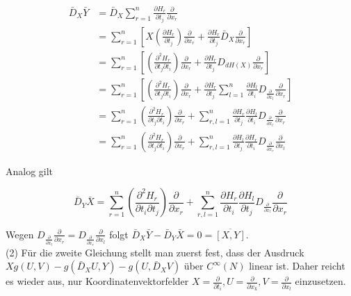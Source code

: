 \documentclass[10pt, letterpaper]{article}
\begin{document}
$$
\begin{aligned}
\bar{D}_{X} \bar{Y} & =\bar{D}_{X} \sum_{r=1}^{n} \frac{\partial H_{r}}{\partial t_{j}} \frac{\partial}{\partial x_{r}} \\
& =\sum_{r=1}^{n}\left[X\left(\frac{\partial H_{r}}{\partial t_{j}}\right) \frac{\partial}{\partial x_{r}}+\frac{\partial H_{r}}{\partial t_{j}} \bar{D}_{X} \frac{\partial}{\partial x_{r}}\right] \\
& =\sum_{r=1}^{n}\left[\left(\frac{\partial^{2} H_{r}}{\partial t_{j} \partial t_{i}}\right) \frac{\partial}{\partial x_{r}}+\frac{\partial H_{r}}{\partial t_{j}} D_{d H(X)} \frac{\partial}{\partial x_{r}}\right] \\
& =\sum_{r=1}^{n}\left[\left(\frac{\partial^{2} H_{r}}{\partial t_{j} \partial t_{i}}\right) \frac{\partial}{\partial x_{r}}+\frac{\partial H_{r}}{\partial t_{j}} \sum_{l=1}^{n} \frac{\partial H_{l}}{\partial t_{i}} D_{\frac{\partial}{\partial x_{l}}} \frac{\partial}{\partial x_{r}}\right] \\
& =\sum_{r=1}^{n}\left(\frac{\partial^{2} H_{r}}{\partial t_{j} \partial t_{i}}\right) \frac{\partial}{\partial x_{r}}+\sum_{r, l=1}^{n} \frac{\partial H_{r}}{\partial t_{j}} \frac{\partial H_{l}}{\partial t_{i}} D_{\frac{\partial}{\partial x_{l}}} \frac{\partial}{\partial x_{r}} \\
& =\sum_{r=1}^{n}\left(\frac{\partial^{2} H_{r}}{\partial t_{j} \partial t_{i}}\right) \frac{\partial}{\partial x_{r}}+\sum_{r, l=1}^{n} \frac{\partial H_{l}}{\partial t_{j}} \frac{\partial H_{r}}{\partial t_{i}} D_{\frac{\partial}{\partial x_{r}}} \frac{\partial}{\partial x_{l}}
\end{aligned}
$$

Analog gilt

$$
\bar{D}_{Y} \bar{X}=\sum_{r=1}^{n}\left(\frac{\partial^{2} H_{r}}{\partial t_{i} \partial t_{j}}\right) \frac{\partial}{\partial x_{r}}+\sum_{r, l=1}^{n} \frac{\partial H_{r}}{\partial t_{i}} \frac{\partial H_{l}}{\partial t_{j}} D_{\frac{\partial}{\partial x_{l}}} \frac{\partial}{\partial x_{r}}
$$

Wegen $D_{\frac{\partial}{\partial x_{l}}} \frac{\partial}{\partial x_{r}}=D_{\frac{\partial}{\partial x_{r}}} \frac{\partial}{\partial x_{l}}$ folgt $\bar{D}_{X} \bar{Y}-\bar{D}_{Y} \bar{X}=0=\overline{[X, Y]}$.\\
(2) Für die zweite Gleichung stellt man zuerst fest, dass der Ausdruck $X g(U, V)-g\left(\bar{D}_{X} U, Y\right)-g\left(U, \bar{D}_{X} V\right)$ über $C^{\infty}(N)$ linear ist. Daher reicht es wieder aus, nur Koordinatenvektorfelder $X=\frac{\partial}{\partial t_{i}}, U=\frac{\partial}{\partial x_{k}}, V=\frac{\partial}{\partial x_{l}}$ einzusetzen.
\end{document}
